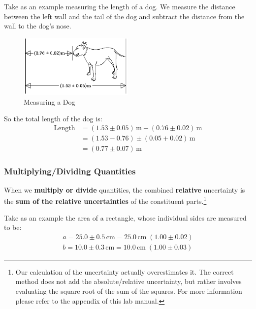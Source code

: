 Take as an example measuring the length of a dog. We measure the distance between the left wall and the tail of the dog and subtract the distance from the wall to the dog's nose.
\begin{figure}[h]
    \begin{center}
        \includegraphics[width=0.5\textwidth]{./Exp1/pic/image2.png}
    \end{center}
    \caption{Measuring a Dog}
    \label{fig:dog}
\end{figure}
So the total length of the dog is:
\begin{equation}
    \begin{split}
        \text{Length} &= (1.53\pm 0.05)\,\mathrm{m} - (0.76 \pm 0.02)\,\mathrm{m} \\
        &= \left( 1.53 - 0.76 \right)\pm\left( 0.05 + 0.02 \right)\,\mathrm{m} \\
        &= \left( 0.77 \pm 0.07 \right)\,\mathrm{m}
    \end{split}
\end{equation}

\subsubsection{Multiplying/Dividing Quantities}

When we \textbf{multiply or divide} quantities, the combined \textbf{relative} uncertainty is the \textbf{sum of the relative uncertainties} of the constituent parts.\footnote{Our calculation of the uncertainty actually overestimates it. The correct method does not add the absolute/relative uncertainty, but rather involves evaluating the square root of the sum of the squares. For more information please refer to the appendix of this lab manual.}

Take as an example the area of a rectangle, whose individual sides are measured to be:
\begin{align}
    a = 25.0\pm 0.5\,\mathrm{cm} = 25.0\,\mathrm{cm}\;(1.00\pm 0.02) \nonumber \\
    b = 10.0\pm 0.3\,\mathrm{cm} = 10.0\,\mathrm{cm}\;(1.00\pm 0.03)
\end{align}


